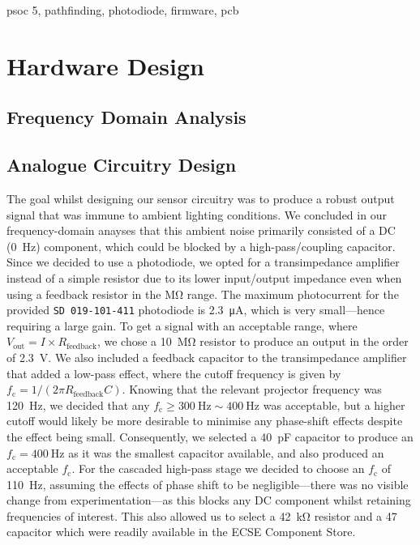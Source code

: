 \documentclass[conference]{IEEEtran}
\begin{document}
\begin{IEEEkeywords}
	psoc 5, pathfinding, photodiode, firmware, pcb
\end{IEEEkeywords}



\section{Hardware Design}

\subsection{Frequency Domain Analysis}


\subsection{Analogue Circuitry Design}

The goal whilst designing our sensor circuitry was to produce a robust output signal that was immune to ambient lighting conditions.
We concluded in our frequency-domain anayses that this ambient noise primarily consisted of a DC (\qty{0}{\hertz}) component, which could be blocked by a high-pass/coupling capacitor.
Since we decided to use a photodiode, we opted for a transimpedance amplifier instead of a simple resistor due to its lower input/output impedance even when using a feedback resistor in the \unit{\Mohm} range.
The maximum photocurrent for the provided \texttt{SD 019-101-411} photodiode is \qty{2.3}{\uA}, which is very small—hence requiring a large gain.
To get a signal with an acceptable range, where $V_\text{out} = I \times R_\text{feedback}$, we chose a \qty{10}{\Mohm} resistor to produce an output in the order of \qty{2.3}{\volt}.
We also included a feedback capacitor to the transimpedance amplifier that added a low-pass effect, where the cutoff frequency is given by $f_\text{c} = 1 / (2\pi R_\text{feedback}C)$.
Knowing that the relevant projector frequency was \qty{120}{\hertz}, we decided that any $f_\text{c}\geq \qty{300}{\hertz}\sim \qty{400}{\hertz}$ was acceptable, but a higher cutoff would likely be more desirable to minimise any phase-shift effects despite the effect being small.
Consequently, we selected a \qty{40}{\pF} capacitor to produce an $f_\text{c}=\qty{400}{\hertz}$ as it was the smallest capacitor available, and also produced an acceptable $f_\text{c}$.
For the cascaded high-pass stage we decided to choose an $f_\text{c}$ of \qty{110}{\hertz}, assuming the effects of phase shift to be negligible—there was no visible change from experimentation—as this blocks any DC component whilst retaining frequencies of interest.
This also allowed us to select a \qty{42}{\kohm} resistor and a \qty{47}{\uF} capacitor which were readily available in the ECSE Component Store.
\end{document}
